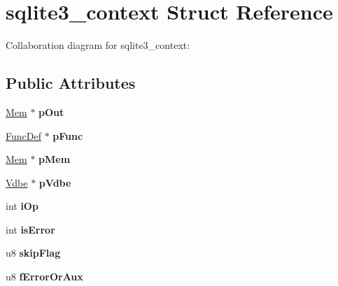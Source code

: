 \hypertarget{structsqlite3__context}{}\section{sqlite3\+\_\+context Struct Reference}
\label{structsqlite3__context}


Collaboration diagram for sqlite3\+\_\+context\+:
\subsection*{Public Attributes}
\begin{DoxyCompactItemize}
\item 
\hyperlink{structMem}{Mem} $\ast$ {\bfseries p\+Out}\hypertarget{structsqlite3__context_ae22b1db2ea357b70dda4a86b6df01f34}{}\label{structsqlite3__context_ae22b1db2ea357b70dda4a86b6df01f34}

\item 
\hyperlink{structFuncDef}{Func\+Def} $\ast$ {\bfseries p\+Func}\hypertarget{structsqlite3__context_af4215c87be2c0cb10868f623a552a2aa}{}\label{structsqlite3__context_af4215c87be2c0cb10868f623a552a2aa}

\item 
\hyperlink{structMem}{Mem} $\ast$ {\bfseries p\+Mem}\hypertarget{structsqlite3__context_a7b84aa5920329cb0eb943832175b48b5}{}\label{structsqlite3__context_a7b84aa5920329cb0eb943832175b48b5}

\item 
\hyperlink{structVdbe}{Vdbe} $\ast$ {\bfseries p\+Vdbe}\hypertarget{structsqlite3__context_ab35b02abe9a81e0c8cbdaeb0aa1a5874}{}\label{structsqlite3__context_ab35b02abe9a81e0c8cbdaeb0aa1a5874}

\item 
int {\bfseries i\+Op}\hypertarget{structsqlite3__context_a6f5930106488b9ead6f8efefe9125b6c}{}\label{structsqlite3__context_a6f5930106488b9ead6f8efefe9125b6c}

\item 
int {\bfseries is\+Error}\hypertarget{structsqlite3__context_ae4351b8da8c6d2676074612c1b8d4af5}{}\label{structsqlite3__context_ae4351b8da8c6d2676074612c1b8d4af5}

\item 
u8 {\bfseries skip\+Flag}\hypertarget{structsqlite3__context_a29c404b8744ed5967960c576f3e59bd3}{}\label{structsqlite3__context_a29c404b8744ed5967960c576f3e59bd3}

\item 
u8 {\bfseries f\+Error\+Or\+Aux}\hypertarget{structsqlite3__context_a342986cd1a7c165151c53af83fe24b1d}{}\label{structsqlite3__context_a342986cd1a7c165151c53af83fe24b1d}


\end{DoxyCompactItemize}
